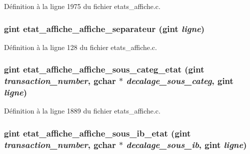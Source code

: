 Définition à la ligne 1975 du fichier etats\_\-affiche.c.

\subsubsection[{etat\_\-affiche\_\-affiche\_\-separateur}]{\setlength{\rightskip}{0pt plus 5cm}gint etat\_\-affiche\_\-affiche\_\-separateur (gint {\em ligne})}\label{etats__affiche_8c_a482bd2d47cd0b5df46e0198231f5660c}


Définition à la ligne 128 du fichier etats\_\-affiche.c.

\subsubsection[{etat\_\-affiche\_\-affiche\_\-sous\_\-categ\_\-etat}]{\setlength{\rightskip}{0pt plus 5cm}gint etat\_\-affiche\_\-affiche\_\-sous\_\-categ\_\-etat (gint {\em transaction\_\-number}, \/  gchar $\ast$ {\em decalage\_\-sous\_\-categ}, \/  gint {\em ligne})}\label{etats__affiche_8c_a20f3e545893f2398023f87c885d9644a}


Définition à la ligne 1889 du fichier etats\_\-affiche.c.

\subsubsection[{etat\_\-affiche\_\-affiche\_\-sous\_\-ib\_\-etat}]{\setlength{\rightskip}{0pt plus 5cm}gint etat\_\-affiche\_\-affiche\_\-sous\_\-ib\_\-etat (gint {\em transaction\_\-number}, \/  gchar $\ast$ {\em decalage\_\-sous\_\-ib}, \/  gint {\em ligne})}\label{etats__affiche_8c_a24b3cc976699bf78cb8e28e5e85d9544}


